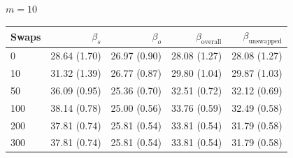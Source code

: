 \begin{table}[H]
\begin{tabular}{l rrrr}
\bottomrule
\end{tabular}
\par\medskip
\noindent\textit{$m = 10$}\\[2pt]
\begin{tabular}{l rrrr}
\toprule
Swaps & $\beta_s$ & $\beta_o$ & $\beta_{\mathrm{overall}}$ & $\beta_{\mathrm{unswapped}}$ \\
\midrule
0 & 28.64 (1.70) & 26.97 (0.90) & 28.08 (1.27) & 28.08 (1.27) \\
10 & 31.32 (1.39) & 26.77 (0.87) & 29.80 (1.04) & 29.87 (1.03) \\
50 & 36.09 (0.95) & 25.36 (0.70) & 32.51 (0.72) & 32.12 (0.69) \\
100 & 38.14 (0.78) & 25.00 (0.56) & 33.76 (0.59) & 32.49 (0.58) \\
200 & 37.81 (0.74) & 25.81 (0.54) & 33.81 (0.54) & 31.79 (0.58) \\
300 & 37.81 (0.74) & 25.81 (0.54) & 33.81 (0.54) & 31.79 (0.58) \\
\bottomrule
\end{tabular}
\end{table}

